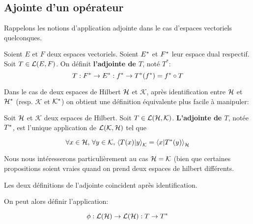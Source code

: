 \subsection{Ajointe d'un opérateur}

Rappelons les notions d'application adjointe dans le cas d'espaces vectoriels
quelconques.

\begin{definition}
	\label{def:adjointe_dual_space}
	Soient $E$ et $F$ deux espaces vectoriels. Soient $E^{*}$ et
	$F^{*}$ leur espace dual respectif.
	Soit $T \in \mathcal{L}(E, F)$. On définit \textbf{l'adjointe de $T$},
	noté $T^{*}$:
	\begin{equation}
		T : F^{*} \rightarrow E^{*} : f^{*} \rightarrow T^{*}(f^{*})
	= f^{*} \circ T
		\label{def:adjointe_operator}
	\end{equation}
\end{definition}

Dans le cas de deux espaces de Hilbert $\mathcal{H}$ et $\mathcal{K}$, après
identification entre $\mathcal{H}$ et $\mathcal{H}^{*}$ (resp. $\mathcal{K}$ et
$\mathcal{K}^{*}$) on obtient une définition équivalente plus facile à
manipuler:

\begin{definition}
	\label{def:adjointe_hilbert_space}
	Soit $\mathcal{H}$ et $\mathcal{K}$ deux espaces de Hilbert.
	Soit $T \in \mathcal{L}(\mathcal{H}, \mathcal{K})$.
	\textbf{L'adjointe de $T$}, notée $T^{*}$, est l'unique application
	de $\mathcal{L}(\mathcal{K}, \mathcal{H})$ tel que

	\begin{equation}
		\forall x \in \mathcal{H}, \, \forall y \in \mathcal{K}, \,
		{\bra{T(x)}\ket{y}}_{\mathcal{K}} = {\bra{x}\ket{T^{*}(y)}}_{\mathcal{H}}
	\end{equation}
\end{definition}

Nous nous intéresserons particulièrement au cas $\mathcal{H} = \mathcal{K}$ (bien
que certaines propositions soient vraies quand on prend deux espaces de hilbert
différents.

\begin{proposition}
	Les deux définitions de l'adjointe coincident après identification.
\end{proposition}

On peut alors définir l'application:

\begin{equation}
	\phi : \mathcal{L}(\mathcal{H}) \rightarrow \mathcal{L}(\mathcal{H}) : T \rightarrow
	T^{*}
\end{equation}

